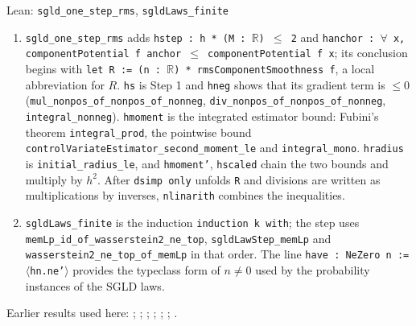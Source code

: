\documentclass[11pt,a4paper]{article}
\begin{document}
\begin{leanbox}{Lean: \texttt{sgld\_\allowbreak{}one\_\allowbreak{}step\_\allowbreak{}rms}, \texttt{sgldLaws\_\allowbreak{}finite}}
\begin{enumerate}
\item \texttt{sgld\_\allowbreak{}one\_\allowbreak{}step\_\allowbreak{}rms} adds \texttt{hstep : h * (M : \ensuremath{\mathbb R}) \ensuremath{\le} 2} and \texttt{hanchor : \ensuremath{\forall} x, component\allowbreak{}Potential f anchor \ensuremath{\le} component\allowbreak{}Potential f x}; its conclusion begins with \texttt{let R := (n : \ensuremath{\mathbb R}) * rms\allowbreak{}Component\allowbreak{}Smoothness f}, a local abbreviation for \(R\). \texttt{hs} is Step 1 and \texttt{hneg} shows that its gradient term is \(\le0\) (\texttt{mul\_\allowbreak{}nonpos\_\allowbreak{}of\_\allowbreak{}nonpos\_\allowbreak{}of\_\allowbreak{}nonneg}, \texttt{div\_\allowbreak{}nonpos\_\allowbreak{}of\_\allowbreak{}nonpos\_\allowbreak{}of\_\allowbreak{}nonneg}, \texttt{integral\_\allowbreak{}nonneg}). \texttt{hmoment} is the integrated estimator bound: Fubini's theorem \texttt{integral\_\allowbreak{}prod}, the pointwise bound \texttt{control\allowbreak{}Variate\allowbreak{}Estimator\_\allowbreak{}second\_\allowbreak{}moment\_\allowbreak{}le} and \texttt{integral\_\allowbreak{}mono}. \texttt{hradius} is \texttt{initial\_\allowbreak{}radius\_\allowbreak{}le}, and \texttt{hmoment'}, \texttt{hscaled} chain the two bounds and multiply by \(h^2\). After \texttt{dsimp only} unfolds \texttt{R} and divisions are written as multiplications by inverses, \texttt{nlinarith} combines the inequalities.

\item \texttt{sgld\allowbreak{}Laws\_\allowbreak{}finite} is the induction \texttt{induction k with}; the step uses \texttt{mem\allowbreak{}Lp\_\allowbreak{}id\_\allowbreak{}of\_\allowbreak{}wasserstein2\_\allowbreak{}ne\_\allowbreak{}top}, \texttt{sgld\allowbreak{}Law\allowbreak{}Step\_\allowbreak{}mem\allowbreak{}Lp} and \texttt{wasserstein2\_\allowbreak{}ne\_\allowbreak{}top\_\allowbreak{}of\_\allowbreak{}mem\allowbreak{}Lp} in that order. The line \texttt{have : Ne\allowbreak{}Zero n := \ensuremath{\langle}hn.\allowbreak{}ne'\ensuremath{\rangle}} provides the typeclass form of \(n\ne0\) used by the probability instances of the SGLD laws.

\end{enumerate}
\end{leanbox}


Earlier results used here: \cite[Section~3.17.3]{LangevinLean2026ULASC}; \cite[Section~3.17.4]{LangevinLean2026ULASC}; \cite[Section~3.21.1]{LangevinLean2026ULASC}; \cite[Section~3.21.2]{LangevinLean2026ULASC}; \cite[Section~3.26.13]{LangevinLean2026ULASC}; \cite[Section~3.26.15]{LangevinLean2026ULASC}; \cite[Section~3.26.3]{LangevinLean2026ULASC}.
\end{document}
